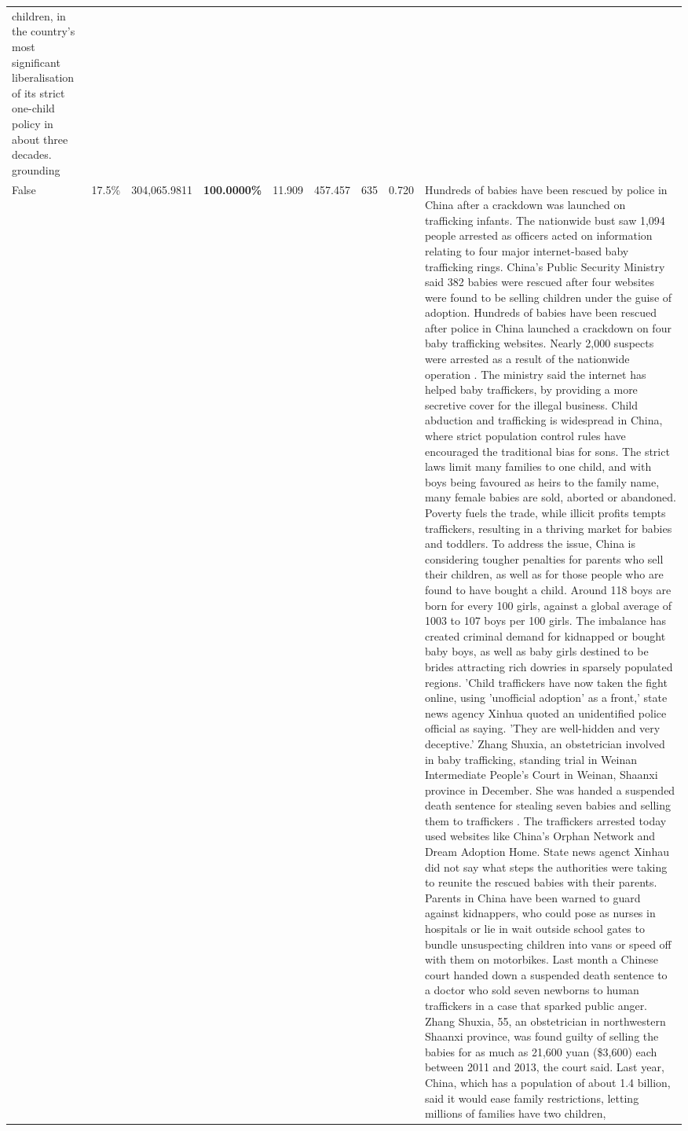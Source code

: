 \begin{table}[H]
\begin{tabular}{lllrlllll}
children, in the country's most significant liberalisation of its strict one-child policy in about three decades. grounding \\
\cline{1-9}
False & 17.5\% & 304,065.9811 & \bfseries \color{red} 100.0000\% & 11.909 & 457.457 & 635 & 0.720 & Hundreds of babies have been rescued by police in China after a crackdown was launched on trafficking infants. The nationwide bust saw 1,094 people arrested as officers acted on information relating to four major internet-based baby trafficking rings. China's Public Security Ministry said 382 babies were rescued after four websites were found to be selling children under the guise of adoption. Hundreds of babies have been rescued after police in China launched a crackdown on four baby trafficking websites. Nearly 2,000 suspects were arrested as a result of the nationwide operation . The ministry said the internet has helped baby traffickers, by providing a more secretive cover for the illegal business. Child abduction and trafficking is widespread in China, where strict population control rules have encouraged the traditional bias for sons. The strict laws limit many families to one child, and with boys being favoured as heirs to the family name, many female babies are sold, aborted or abandoned. Poverty fuels the trade, while illicit profits tempts traffickers, resulting in a thriving market for babies and toddlers. To address the issue, China is considering tougher penalties for parents who sell their children, as well as for those people who are found to have bought a child. Around 118 boys are born for every 100 girls, against a global average of 1003 to 107 boys per 100 girls. The imbalance has created criminal demand for kidnapped or bought baby boys, as well as baby girls destined to be brides attracting rich dowries in sparsely populated regions. 'Child traffickers have now taken the fight online, using 'unofficial adoption' as a front,' state news agency Xinhua quoted an unidentified police official as saying. 'They are well-hidden and very deceptive.' Zhang Shuxia, an obstetrician involved in baby trafficking, standing trial in Weinan Intermediate People's Court in Weinan, Shaanxi province in December. She was handed a suspended death sentence for stealing seven babies and selling them to traffickers . The traffickers arrested today used websites like China's Orphan Network and Dream Adoption Home. State news agenct Xinhau did not say what steps the authorities were taking to reunite the rescued babies with their parents. Parents in China have been warned to guard against kidnappers, who could pose as nurses in hospitals or lie in wait outside school gates to bundle unsuspecting children into vans or speed off with them on motorbikes. Last month a Chinese court handed down a suspended death sentence to a doctor who sold seven newborns to human traffickers in a case that sparked public anger. Zhang Shuxia, 55, an obstetrician in northwestern Shaanxi province, was found guilty of selling the babies for as much as 21,600 yuan (\$3,600) each between 2011 and 2013, the court said. Last year, China, which has a population of about 1.4 billion, said it would ease family restrictions, letting millions of families have two children, 
\end{tabular}
\end{table}
